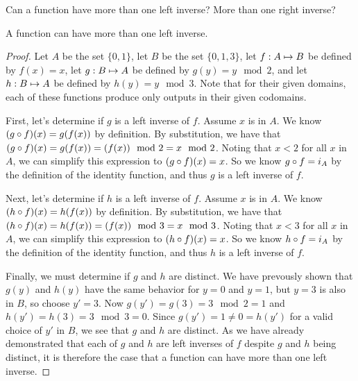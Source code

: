 \documentclass[main.tex]{subfiles}
\begin{document}
\subproblem{}\label{s2p5d}

Can a function have more than one left inverse? More than one right inverse?

\begin{thm}
	A function can have more than one left inverse.
\end{thm}
\begin{proof}
	Let \(A\) be the set \(\{0,1\}\), let \(B\) be the set \(\{0,1,3\}\),
	let \({f}: {A} \mapsto{} {B}\) be defined by \(f(x) = x\), let
	\({g}: {B} \mapsto{} {A}\) be defined by \(g(y) = y \mod 2\), and let
	\({h}: {B} \mapsto{} {A}\) be defined by \(h(y) = y \mod 3\). Note that for
	their given domains, each of these functions produce only outputs in
	their given codomains.

	First, let's determine if \(g\) is a left inverse of \(f\). Assume \(x\)
	is in \(A\). We know \(({g} \circ{} {f})({x}) = g(f(x))\) by definition.
	By substitution, we have that
	\(({g} \circ{} {f})({x}) = g(f(x)) = (f(x)) \mod 2 = x \mod 2\).
	Noting that \(x < 2\) for all \(x\) in \(A\), we can simplify this
	expression to \(({g} \circ{} {f})({x}) = x\). So we know
	\({g} \circ{} {f} = i_A\) by the definition of the identity function, and
	thus \(g\) is a left inverse of \(f\).

	Next, let's determine if \(h\) is a left inverse of \(f\). Assume \(x\)
	is in \(A\). We know \(({h} \circ{} {f})({x}) = h(f(x))\) by definition.
	By substitution, we have that
	\(({h} \circ{} {f})({x}) = h(f(x)) = (f(x)) \mod 3 = x \mod 3\).
	Noting that \(x < 3\) for all \(x\) in \(A\), we can simplify this
	expression to \(({h} \circ{} {f})({x}) = x\). So we know
	\({h} \circ{} {f} = i_A\) by the definition of the identity function, and
	thus \(h\) is a left inverse of \(f\).

	Finally, we must determine if \(g\) and \(h\) are distinct. We have
	prevously shown that \(g(y)\) and \(h(y)\) have the same behavior for
	\(y = 0\) and \(y = 1\), but \(y = 3\) is also in \(B\), so choose
	\(y' = 3\). Now \(g(y') = g(3) = 3 \mod 2 = 1\) and
	\(h(y') = h(3) = 3 \mod 3 = 0\). Since \(g(y') = 1 \neq 0 = h(y')\) for
	a valid choice of \(y'\) in \(B\), we see that \(g\) and \(h\) are
	distinct. As we have already demonstrated that each of \(g\) and \(h\)
	are left inverses of \(f\) despite \(g\) and \(h\) being distinct, it is
	therefore the case that a function can have more than one left inverse.
\end{proof}
\end{document}
